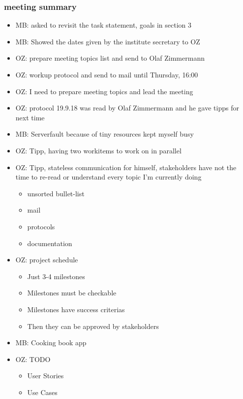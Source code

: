 \documentclass{article}
\begin{document}
\subsubsection{meeting summary}
\begin{itemize}
    \item MB: asked to revisit the task statement, goals in section 3
    \item MB: Showed the dates given by the institute secretary to OZ
    \item OZ: prepare meeting topics list and send to Olaf Zimmermann
    \item OZ: workup protocol and send to mail until Thursday, 16:00
    \item OZ: I need to prepare meeting topics and lead the meeting
    \item OZ: protocol 19.9.18 was read by Olaf Zimmermann and he gave tipps for next time
    \item MB: Serverfault because of tiny resources kept myself busy
    \item OZ: Tipp, having two workitems to work on in parallel
    \item OZ: Tipp, stateless communication for himself, stakeholders have not the time to re-read or understand every topic I'm currently doing
        \begin{itemize}
            \item unsorted bullet-list
            \item mail
            \item protocols
            \item documentation
        \end{itemize}   
    \item OZ: project schedule
        \begin{itemize}
            \item Just 3-4 milestones
            \item Milestones must be checkable
            \item Milestones have success criterias
            \item Then they can be approved by stakeholders
        \end{itemize}
    \item MB: Cooking book app
    \item OZ: TODO
        \begin{itemize}
            \item User Stories
            \item Use Cases

\end{itemize}
\end{itemize}
\end{document}
